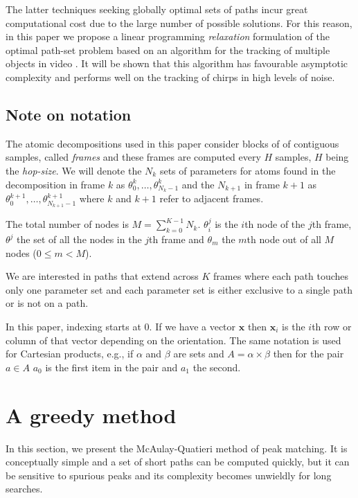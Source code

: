 \documentclass{article}
\newcommand{\BS}[1]{\boldsymbol{#1}}
\begin{document}
\begin{sloppy}
The latter techniques seeking globally optimal sets of paths incur great
computational cost due to the large number of possible solutions. For this reason, in
this paper we propose a linear programming \textit{relaxation} formulation of
the optimal path-set problem based on
an algorithm for the tracking of multiple objects in video
\cite{jiang2007linear}. It will be shown that this algorithm has favourable
asymptotic complexity and performs well on the tracking of chirps in high levels
of noise.

\subsection{Note on notation}

The atomic decompositions used in this paper consider blocks of 
of contiguous samples, called \textit{frames} and these frames are
computed every $H$ samples, $H$ being the \textit{hop-size}. We will denote the
$N_{k}$ sets of parameters for atoms found in the decomposition in frame $k$ as $\theta_0^{k},
\dotsc, \theta_{N_{k}-1}^{k}$ and the $N_{k+1}$ in frame $k+1$ as
$\theta_0^{k+1}, \dotsc, \theta_{N_{k+1}-1}^{k+1}$ where $k$ and $k+1$ refer to
adjacent frames.

The total number of nodes is $M = \sum_{k=0}^{K-1} N_{k}$. $\theta_{i}^{j}$ is the
$i$th node of the $j$th frame, $\theta^{j}$ the set of all the nodes in the
$j$th frame and $\theta_{m}$ the $m$th node out of all $M$ nodes ($0 \leq m <
M$).

We are interested in paths that extend across $K$ frames where
each path touches only one parameter set and each parameter set is either
exclusive to a single path or is not on a path.

In this paper, indexing starts at 0. If we have a vector $\BS{x}$ then
$\BS{x}_{i}$ is the $i$th row or column of that vector depending on the
orientation. The same notation is used for Cartesian products, e.g., if $\alpha$
and $\beta$ are sets and $A =
\alpha \times \beta$ then for the pair $a \in A$ $a_{0}$ is the first item in
the pair and $a_{1}$ the second.

\section{A greedy method}

In this section, we present the McAulay-Quatieri method of peak matching. It is
conceptually simple and a set of short paths can be computed quickly, but it can
be sensitive to spurious peaks and its complexity becomes unwieldly for long
searches.


\end{sloppy}
\end{document}
